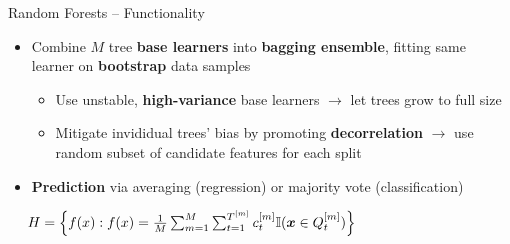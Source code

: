 \begin{frame}{Random Forests -- Functionality}

 
  

\medskip

\begin{itemize}
  \item Combine $M$ tree \textbf{base learners} into 
  \textbf{bagging ensemble}, fitting same learner on \textbf{bootstrap} data
  samples
   \begin{itemize}
    \item Use unstable, \textbf{high-variance} base learners $\rightarrow$
    let trees grow to full size
    \item Mitigate invididual trees' bias by promoting \textbf{decorrelation} 
    $\rightarrow$ use random subset of 
    candidate features for each split
  \end{itemize}
  \item \textbf{Prediction} via averaging (regression) or majority vote 
  (classification)
\end{itemize}

\medskip

 ~~
$H = \left\{ f(x): f(x) = \frac{1}{M} \sum_{m = 1}^M \sum_{t = 1}^{T^{[m]}} 
c_t^{[m]} \mathbb{I}(\bm{x} \in Q_t^{[m]}) \right\}$

\medskip


\end{frame}
